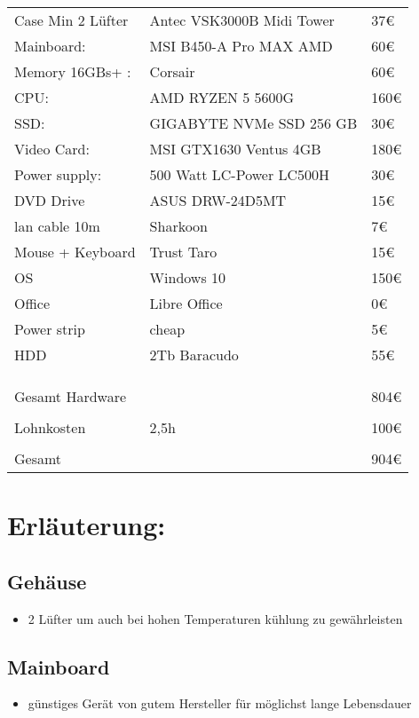 \documentclass[11pt]{article}
\begin{document}
\begin{center}
\begin{tabular}{lll}
Case Min 2 Lüfter & Antec VSK3000B Midi Tower & 37€\\
Mainboard: & MSI B450-A Pro MAX AMD & 60€\\
Memory 16GBs+ : & Corsair & 60€\\
CPU: & AMD RYZEN 5 5600G & 160€\\
SSD: & GIGABYTE NVMe SSD 256 GB & 30€\\
Video Card: & MSI GTX1630 Ventus 4GB & 180€\\
Power supply: & 500 Watt LC-Power LC500H & 30€\\
DVD Drive & ASUS DRW-24D5MT & 15€\\
lan cable 10m & Sharkoon & 7€\\
Mouse + Keyboard & Trust Taro & 15€\\
OS & Windows 10 & 150€\\
Office & Libre Office & 0€\\
Power strip & cheap & 5€\\
HDD & 2Tb Baracudo & 55€\\
 &  & \\
 &  & \\
 &  & \\
Gesamt Hardware &  & 804€\\
 &  & \\
\hline
Lohnkosten & 2,5h & 100€\\
 &  & \\
\hline
Gesamt &  & 904€\\
\end{tabular}
\end{center}


\section{Erläuterung:}
\label{sec:org0da2ee6}
\subsection{Gehäuse}
\label{sec:orgf271f36}
\begin{itemize}
\item 2 Lüfter um auch bei hohen Temperaturen kühlung zu gewährleisten
\end{itemize}
\subsection{Mainboard}
\label{sec:org79428fb}
\begin{itemize}
\item günstiges Gerät von gutem Hersteller für möglichst lange Lebensdauer
\end{itemize}
\end{document}
